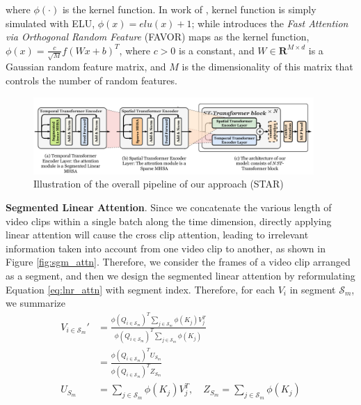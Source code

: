 \documentclass[letterpaper]{article} %
\begin{document}
where $\phi(\cdot)$ is the kernel function. In work of \cite{katharopoulos20a}, kernel function is simply simulated with ELU, $\phi(x) = elu(x) + 1$; while \cite{choromanski2021rethinking} introduces the \textit{Fast Attention via Orthogonal Random Feature} (FAVOR) maps as the kernel function, $\phi(x) = \frac{c}{\sqrt{M}} f(W x + b)^T$, where $c > 0$ is a constant, and $W \in \mathbf{R}^{M \times d}$ is a Gaussian random feature matrix, and $M$ is the dimensionality of this matrix that controls the number of random features.

\begin{figure}[h!] %
    \centering
    \includegraphics[width=0.95\textwidth]{architecture.pdf}
    \caption{Illustration of the overall pipeline of our approach (STAR)}
    \label{fig:arch}
\end{figure}

\textbf{Segmented Linear Attention}. Since we concatenate the various length of video clips within a single batch along the time dimension, directly applying linear attention will cause the cross clip attention, leading to irrelevant information taken into account from one video clip to another, as shown in Figure \ref{fig:sgm_attn}. Therefore, we consider the frames of a video clip arranged as a segment, and then we design the segmented linear attention by reformulating Equation \ref{eq:lnr_attn} with segment index. Therefore, for each $V_i$ in segment $\mathcal{S}_m$, we summarize
\begin{equation}
    \begin{split}
        V_{i \in \mathcal{S}_m}' &= \frac{\phi(Q_{i \in \mathcal{S}_m})^T \sum_{j \in \mathcal{S}_m} \phi(K_{j}) V_j^T}{\phi(Q_{i \in \mathcal{S}_m})^T \sum_{j \in \mathcal{S}_m} \phi(K_j)} \\ 
        &= \frac{\phi(Q_{i \in \mathcal{S}_m})^T U_{S_m}}{\phi(Q_{i \in \mathcal{S}_m})^T Z_{S_m}} \\
        U_{S_m} &= \sum_{j \in \mathcal{S}_m} \phi(K_{j}) V_j^T, \quad Z_{S_m} = \sum_{j \in \mathcal{S}_m} \phi(K_j) 
    \end{split}
    \label{eq:sgm_lin_attn}
\end{equation}
\end{document}
